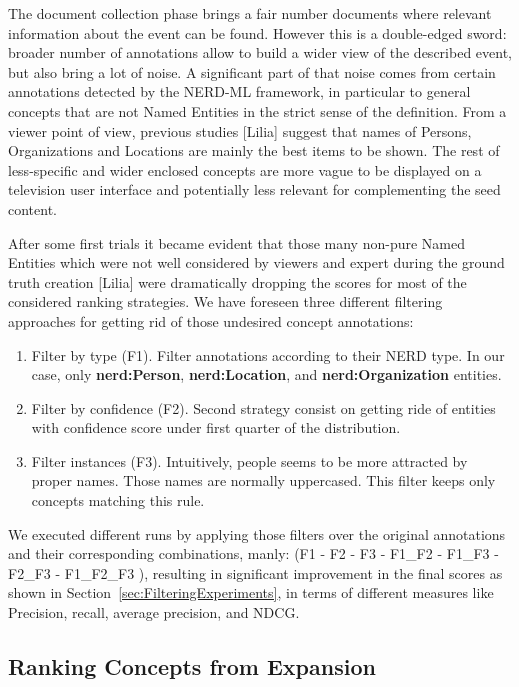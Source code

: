 \documentclass{llncs}
\begin{document}
The document collection phase brings a fair number documents where relevant information about the event can be found. However this is a double-edged sword: broader number of annotations allow to build a wider view of the described event, but also bring a lot of noise. A significant part of that noise comes from certain annotations detected by the NERD-ML framework, in particular to general concepts that are not Named Entities in the strict sense of the definition. From a viewer point of view, previous studies [Lilia] suggest that names of Persons, Organizations and Locations are mainly the best items to be shown. The rest of less-specific and wider enclosed concepts are more vague to be displayed on a television user interface and potentially less relevant for complementing the seed content.

After some first trials it became evident that those many non-pure Named Entities which were not well considered by viewers and expert during the ground truth creation [Lilia] were dramatically dropping the scores for most of the considered ranking strategies. We have foreseen three different filtering approaches for getting rid of those undesired concept annotations:

\begin{enumerate}
\item Filter by type (F1). Filter annotations according to their NERD type. In our case, only \textbf{nerd:Person}, \textbf{nerd:Location}, and \textbf{nerd:Organization} entities.
\item Filter by confidence (F2). Second strategy consist on getting ride of entities with confidence score under first quarter of the distribution.
\item Filter instances (F3). Intuitively, people seems to be more attracted by proper names. Those names are normally uppercased. This filter keeps only concepts matching this rule.
\end{enumerate}

We executed different runs by applying those filters over the original annotations and their corresponding combinations, manly: (F1 - F2 - F3 - F1\_F2 - F1\_F3 - F2\_F3 - F1\_F2\_F3 ), resulting in significant improvement in the final scores as shown in Section~\ref{sec:FilteringExperiments}, in terms of different measures like Precision, recall, average precision, and NDCG. 

\subsection{Ranking Concepts from Expansion}
\label{sec:Ranking}
\end{document}
